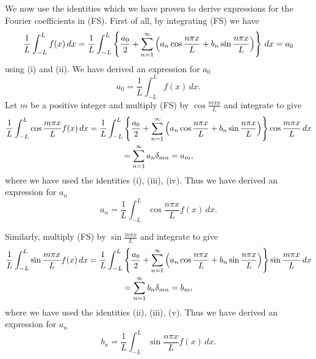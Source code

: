 \documentclass[10pt, a4paper]{article}
\begin{document}
We now use the identities which we have proven to derive expressions for the Fourier coefficients in (FS).
First of all,
by integrating (FS) we have
\[
\frac{1}{L}\int_{-L}^{L}f(x)\,dx = \frac{1}{L}\int_{-L}^{L}\left\{\frac{a_0}{2} + \infsum[n = 1]\left(a_n\cos{\frac{n\pi x}{L}} + b_n\sin{\frac{n\pi x}{L}}\right)\right\}\,dx = a_0
\]
using (i) and (ii).
We have derived an expression for $a_0$
\[
a_0 = \frac{1}{L}\int_{-L}^{L}f(x)\,dx.
\]
Let $m$ be a positive integer and multiply (FS) by $\cos{\frac{m\pi x}{L}}$ and integrate to give
\begin{gather*}
    \frac{1}{L}\int_{-L}^{L}\cos{\frac{m\pi x}{L}}f(x)\,dx = \frac{1}{L}\int_{-L}^{L}\left\{\frac{a_0}{2} + \infsum[n = 1]\left(a_n\cos{\frac{n\pi x}{L}} + b_n\sin{\frac{n\pi x}{L}}\right)\right\}\cos{\frac{m\pi x}{L}}\,dx \\
    = \infsum[n = 1]a_n\delta_{mn} = a_m,
\end{gather*}
where we have used the identities (i),
(iii),
(iv).
Thus we have derived an expression for $a_n$
\[
a_n = \frac{1}{L}\int_{-L}^{L}\cos{\frac{n\pi x}{L}}f(x)\,dx.
\]

Similarly,
multiply (FS) by $\sin{\frac{m\pi x}{L}}$ and integrate to give
\begin{gather*}
    \frac{1}{L}\int_{-L}^{L}\sin{\frac{m\pi x}{L}}f(x)\,dx = \frac{1}{L}\int_{-L}^{L}\left\{\frac{a_0}{2} + \infsum[n = 1]\left(a_n\cos{\frac{n\pi x}{L}} + b_n\sin{\frac{n\pi x}{L}}\right)\right\}\sin{\frac{m\pi x}{L}}\,dx \\
    = \infsum[n = 1]b_n\delta_{mn} = b_m,
\end{gather*}
where we have used the identities (ii),
(iii),
(v).
Thus we have derived an expression for $a_n$
\[
b_n = \frac{1}{L}\int_{-L}^{L}\sin{\frac{n\pi x}{L}}f(x)\,dx.
\]
\end{document}
